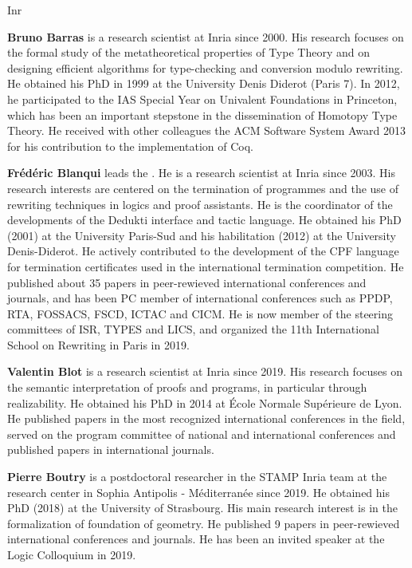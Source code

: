 \begin{sitedescription}{Inr}
\begin{compactitem} %

\item{\bf Bruno Barras} is a research scientist at Inria since
  2000. His research focuses on the formal study of the
  metatheoretical properties of Type Theory and on designing efficient
  algorithms for type-checking and conversion modulo rewriting. He
  obtained his PhD in 1999 at the University Denis Diderot (Paris
  7). In 2012, he participated to the IAS Special Year on Univalent
  Foundations in Princeton, which has been an important stepstone in
  the dissemination of Homotopy Type Theory. He received with other
  colleagues the ACM Software System Award 2013 for his contribution
  to the implementation of Coq.

\item{\bf Frédéric Blanqui} leads the . He is a research scientist at Inria since 2003. His research interests are centered on the termination of programmes and the use of rewriting techniques in logics and proof assistants. He is the coordinator of the developments of the Dedukti interface and tactic language. He obtained his PhD (2001) at the University Paris-Sud and his habilitation (2012) at the University Denis-Diderot. He actively contributed to the development of the CPF language for termination certificates used in the international termination competition. He published about 35 papers in peer-rewieved international conferences and journals, and has been PC member of international conferences such as PPDP, RTA, FOSSACS, FSCD, ICTAC and CICM. He is now member of the steering committees of ISR, TYPES and LICS, and organized the 11th International School on Rewriting in Paris in 2019.

\item{\bf Valentin Blot} is a research scientist at Inria since 2019. His research focuses on the semantic interpretation of proofs and programs, in particular through realizability. He obtained his PhD in 2014 at \'Ecole Normale Sup\'erieure de Lyon. He published papers in the most recognized international conferences in the field, served on the program committee of national and international conferences and published papers in international journals.

\item{\bf Pierre Boutry} is a postdoctoral researcher in the STAMP Inria team at the research center in Sophia Antipolis - M\'editerran\'ee since 2019.
He obtained his PhD (2018) at the University of Strasbourg.
His main research interest is in the formalization of foundation of geometry.
He published 9 papers in peer-rewieved international conferences and journals.
He has been an invited speaker at the Logic Colloquium in 2019.


\end{compactitem}
\end{sitedescription}
